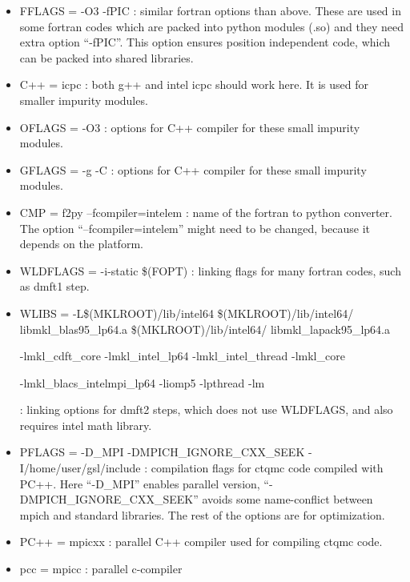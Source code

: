 \documentclass[12 pt]{article}
\begin{document}
{\begin{itemize}
\begin{itemize}
    \end{itemize}

  \item FFLAGS = -O3 -fPIC : similar fortran options than above. These are used in some fortran codes which are packed 
into python modules (.so) and they need extra option ``-fPIC''. This option ensures position independent code, which 
can be packed into shared libraries.

  \item C++ = icpc : both g++ and intel icpc should work here. It is used for smaller impurity modules.

  \item OFLAGS = -O3 : options for C++ compiler for these small impurity modules.

  \item GFLAGS = -g -C : options for C++ compiler for these small impurity modules.

  \item CMP = f2py --fcompiler=intelem : name of the fortran to python converter. The option ``--fcompiler=intelem'' 
might need to be changed, because it depends on the platform.

  \item WLDFLAGS = -i-static \$(FOPT) : linking flags for many fortran codes, such as dmft1 step. 

  \item WLIBS = -L\$(MKLROOT)/lib/intel64 \$(MKLROOT)/lib/intel64/\\libmkl\_blas95\_lp64.a \$(MKLROOT)/lib/intel64/
libmkl\_lapack95\_lp64.a

  -lmkl\_cdft\_core -lmkl\_intel\_lp64 -lmkl\_intel\_thread -lmkl\_core
  
  -lmkl\_blacs\_intelmpi\_lp64 -liomp5 -lpthread -lm 

  : linking options for dmft2 steps, which does not use WLDFLAGS, and also requires intel math library.

  \item PFLAGS = -D\_MPI -DMPICH\_IGNORE\_CXX\_SEEK -I/home/user/gsl/include : compilation flags for ctqmc code 
compiled with PC++. Here ``-D\_MPI'' enables parallel version, ``-DMPICH\_IGNORE\_CXX\_SEEK'' avoids some name-conflict 
between mpich and standard libraries. The rest of the options are for optimization.

  \item PC++ = mpicxx : parallel C++ compiler used for compiling ctqmc code.

  \item pcc = mpicc : parallel c-compiler


\end{itemize}}
\end{document}
